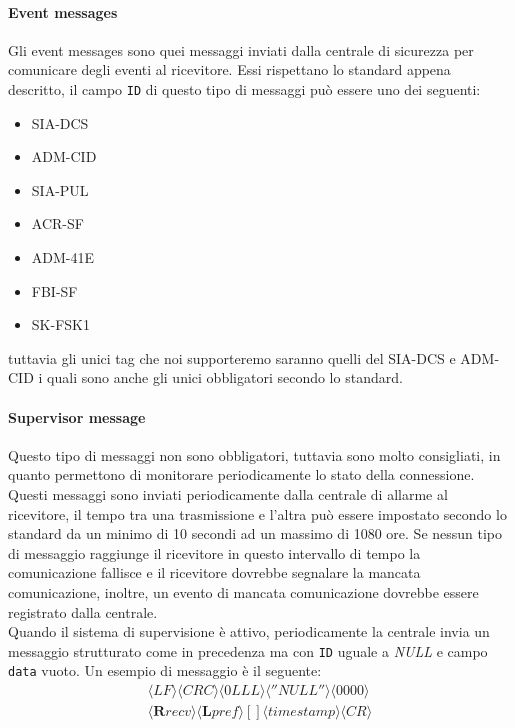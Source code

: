 \paragraph{Event messages}
Gli event messages sono quei messaggi inviati dalla centrale di sicurezza per comunicare degli eventi al ricevitore. Essi rispettano lo standard appena descritto, il campo \texttt{ID} di questo tipo di messaggi può essere uno dei seguenti:
\begin{itemize}
	\item SIA-DCS
	\item ADM-CID
	\item SIA-PUL
	\item ACR-SF
	\item ADM-41E
	\item FBI-SF
	\item SK-FSK1
\end{itemize}
tuttavia gli unici tag che noi supporteremo saranno quelli del SIA-DCS e ADM-CID i quali sono anche gli unici obbligatori secondo lo standard.
\paragraph{Supervisor message}
Questo tipo di messaggi non sono obbligatori, tuttavia sono molto consigliati, in quanto permettono di monitorare periodicamente lo stato della connessione. Questi messaggi sono inviati periodicamente dalla centrale di allarme al ricevitore, il tempo tra una trasmissione e l'altra può essere impostato secondo lo standard da un minimo di 10 secondi ad un massimo di 1080 ore. Se nessun tipo di messaggio raggiunge il ricevitore in questo intervallo di tempo la comunicazione fallisce e il ricevitore dovrebbe segnalare la mancata comunicazione, inoltre, un evento di mancata comunicazione dovrebbe essere registrato dalla centrale.\\
Quando il sistema di supervisione è attivo, periodicamente la centrale invia un messaggio strutturato come in precedenza ma con \texttt{ID} uguale a \emph{NULL} e campo \texttt{data} vuoto. Un esempio di messaggio è il seguente:
$$
\begin{array}{c}
\langle LF\rangle\langle CRC\rangle\langle 0LLL\rangle\langle ''NULL''\rangle\langle 0000\rangle\\\langle\textbf{R}recv\rangle\langle\textbf{L}pref\rangle
{[]}\langle timestamp\rangle \langle CR\rangle\\
\end{array}	 
$$
